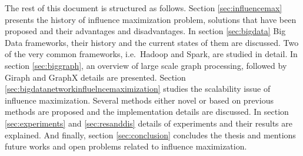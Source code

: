 \documentclass[english]{tktltiki}
\begin{document}
The rest of this document is structured as follows. 
Section \ref{sec:influencemax} presents the history of influence maximization problem, solutions that have been proposed and their advantages and disadvantages. 
In section \ref{sec:bigdata} Big Data frameworks, their history and the current states of them are discussed. Two of the very common frameworks, i.e.\ Hadoop and Spark, are studied in detail. 
In section \ref{sec:biggraph}, an overview of large scale graph processing, followed by Giraph and GraphX details are presented. 
Section \ref{sec:bigdatanetworkinfluelncemaximization} studies the scalability issue of influence maximization.
Several methods either novel or based on previous methods are proposed and the implementation details are discussed. 
In section \ref{sec:experiments} and \ref{sec:resanddis} details of experiments and their results are explained. 
And finally, section \ref{sec:conclusion} concludes the thesis and mentions future works and open problems related to influence maximization.


\newpage
\end{document}
